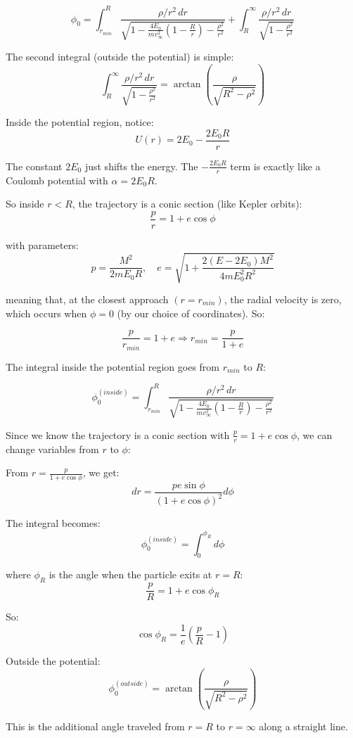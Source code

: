 \documentclass[]{article}
\numberwithin{equation}{section}
\newcommand{\0}{\textcolor{gray}{0}}
\begin{document}
	$$\phi_0 = \int^{R}_{r_{min}} \frac{\rho/r^2 \, dr}{\sqrt{1 - \frac{4E_0}{mv^2_\infty}\left(1 - \frac{R}{r}\right) - \frac{\rho^2}{r^2}}} + \int^{\infty}_{R} \frac{\rho/r^2 \, dr}{\sqrt{1 - \frac{\rho^2}{r^2}}}$$
	
	The second integral (outside the potential) is simple:
	$$\int^{\infty}_{R} \frac{\rho/r^2 \, dr}{\sqrt{1 - \frac{\rho^2}{r^2}}} = \arctan\left(\frac{\rho}{\sqrt{R^2 - \rho^2}}\right)$$
		
	Inside the potential region, notice:
	$$U(r) = 2E_0 - \frac{2E_0 R}{r}$$
	
	The constant $2E_0$ just shifts the energy. The $-\frac{2E_0 R}{r}$ term is exactly like a Coulomb potential with $\alpha = 2E_0R$.
	
	So inside $r < R$, the trajectory is a conic section (like Kepler orbits):
	$$\frac{p}{r} = 1 + e\cos\phi$$
	
	with parameters:
	$$p = \frac{M^2}{2mE_0R}, \quad e = \sqrt{1 + \frac{2(E - 2E_0)M^2}{4mE_0^2R^2}}$$
	
	meaning that, at the closest approach $(r=r_{min})$, the radial velocity is zero, which occurs when $\phi=0$ (by our choice of coordinates). So:
	
	$$\frac{p}{r_{min}} = 1 + e \Rightarrow r_{min} = \frac{p}{1 + e}$$
	
	
	The integral inside the potential region goes from $r_{min}$ to $R$:
	
	$$\phi_0^{(inside)} = \int_{r_{min}}^{R} \frac{\rho/r^2 \, dr}{\sqrt{1 - \frac{4E_0}{mv^2_\infty}\left(1 - \frac{R}{r}\right) - \frac{\rho^2}{r^2}}}$$
	
	Since we know the trajectory is a conic section with $\frac{p}{r} = 1 + e\cos\phi$, we can change variables from $r$ to $\phi$:
	
	From $r = \frac{p}{1 + e\cos\phi}$, we get:
	$$dr = \frac{pe\sin\phi}{(1 + e\cos\phi)^2} d\phi$$
	
	The integral becomes:
	$$\phi_0^{(inside)} = \int_{0}^{\phi_R} d\phi$$
	
	where $\phi_R$ is the angle when the particle exits at $r = R$:
	$$\frac{p}{R} = 1 + e\cos\phi_R$$
	
	So:
	$$\cos\phi_R = \frac{1}{e}\left(\frac{p}{R} - 1\right)$$
	
	Outside the potential:
	$$\phi_0^{(outside)} = \arctan\left(\frac{\rho}{\sqrt{R^2 - \rho^2}}\right)$$
	
	This is the additional angle traveled from $r = R$ to $r = \infty$ along a straight line.
	
\end{document}
